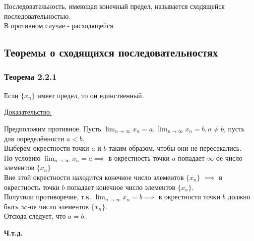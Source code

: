 \documentclass[12pt]{article}
\def\posl#1#2{\{#1_{#2}\}}
\begin{document}
    \noindent Последовательность, имеющая конечный предел, называется сходящейся последовательностью.\\В противном случае - расходящейся.

    \subsection{Теоремы о сходящихся последовательностях}
    \subsubsection*{Теорема 2.2.1}\label{th:2.2.1}
    Если $\posl{x}{n}$ имеет предел, то он единственный.\par\noindent
    \underline{Доказательство:}
    \begin{adjustwidth}{1.5em}{1.5em}
        Предположим противное. Пусть $\lim_{n\to\infty}x_n = a, \lim_{n\to\infty}x_n = b, a \ne b$, пусть для определённости $a < b$.\\
        Выберем окрестности точки $a$ и $b$ таким образом, чтобы они не пересекались.\\
        По условию $\lim_{n\to\infty} x_n = a \implies$ в окрестность точки $a$ попадает $\infty$-ое число элементов $\posl{x}{n}$\\
        Вне этой окрестности находится конечное число элементов $\posl{x}{n}$ $\implies$ в окрестность точки $b$ попадает конечное число элементов $\posl{x}{n}$.\\
        Получили противоречие, т.к. $\lim_{n\to\infty}x_n = b \implies$ в окрестности точки $b$ должно быть $\infty$-ое число элементов $\posl{x}{n}$.\\
        Отсюда следует, что $a = b$.
        \begin{center}
            \textbf{Ч.т.д.}
        \end{center}    
    \end{adjustwidth}
\end{document}
